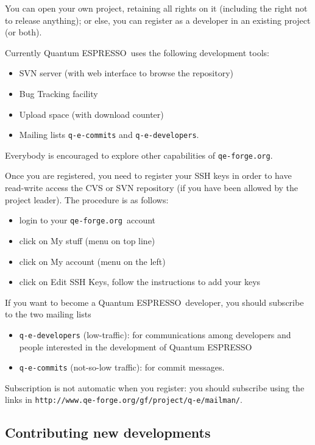 \documentclass[12pt,a4paper]{article}
\def\qe{{\sc Quantum ESPRESSO}}
\def\qeforge{\texttt{qe-forge.org}}
\begin{document}
You can open your own project, retaining all rights on it (including 
the right not to release anything); or else, you can register as a 
developer in an existing project (or both).

Currently \qe\ uses the following development tools:
\begin{itemize}
\item SVN server (with web interface to browse the repository)
\item Bug Tracking facility
\item Upload space (with download counter)
\item Mailing lists \texttt{q-e-commits} and \texttt{q-e-developers}.
\end{itemize}
Everybody is encouraged to explore other capabilities of \qeforge.

Once you are registered, you need to register your SSH keys in order
to have read-write access the CVS or SVN repository (if you have been
allowed by the project leader). The procedure is as follows:
\begin{itemize}
\item login to your \qeforge\ account
\item click on My stuff (menu on top line)
\item click on My account (menu on the left)
\item click on Edit SSH Keys, follow the instructions to add your keys
\end{itemize}

If you want to become a \qe\ developer, you should subscribe to
the two mailing lists
\begin{itemize}
\item \texttt{q-e-developers} (low-traffic):
for communications among developers and people interested
in the development of \qe
\item \texttt{q-e-commits} (not-so-low traffic): for commit messages.
\end{itemize}
Subscription is not automatic when you register: you should
subscribe using the links in
\texttt{http://www.qe-forge.org/gf/project/q-e/mailman/}.

\subsection{Contributing new developments}
\end{document}
